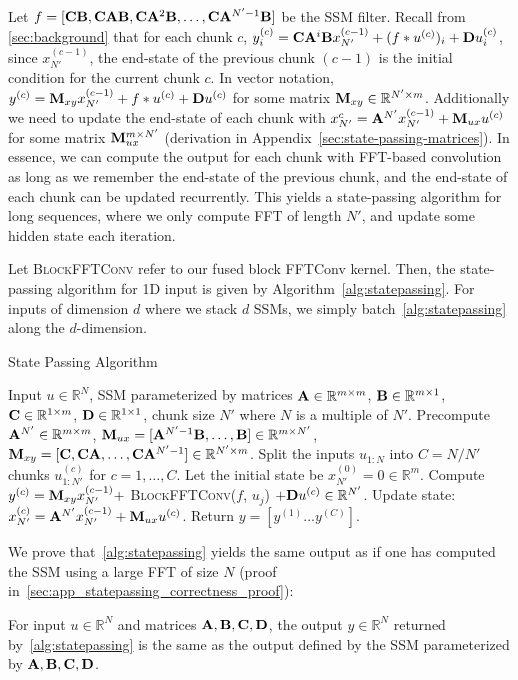 Let $f = [\mathbf{C} \mathbf{B}, \mathbf{C}\mathbf{A}\mathbf{B}, \mathbf{C}\mathbf{A}^2\mathbf{B}, \dots, \mathbf{C}\mathbf{A}^{N'-1}\mathbf{B}]$ be the SSM filter.
Recall from \cref{sec:background} that for each chunk $c$, $y_i^{(c)} = \mathbf{C}\mathbf{A}^i\mathbf{B} x_{N'}^{(c-1)} + (f \ast u^{(c)})_i + \mathbf{D} u_i^{(c)}$, since $x_{N'}^{(c-1)}$, the end-state of the previous chunk $(c-1)$ is the initial condition for the current chunk $c$.
In vector notation, $y^{(c)} = \mathbf{M}_{xy} x_{N'}^{(c-1)} + f \ast u^{(c)} + \mathbf{D} u^{(c)}$ for some matrix $\mathbf{M}_{xy} \in \mathbb{R}^{N' \times m}$.
Additionally we need to update the end-state of each chunk with $x_{N'}^{c} = \mathbf{A}^{N'} x_{N'}^{(c-1)} + \mathbf{M}_{ux} u^{(c)}$ for some matrix $\mathbf{M}_{ux}^{m \times N'}$ (derivation in Appendix~\ref{sec:state-passing-matrices}).
In essence, we can compute the output for each chunk with FFT-based convolution as long as we remember the end-state of the previous chunk, and the end-state of each chunk can be updated recurrently.
This yields a state-passing algorithm for long sequences, where we only compute FFT of length $N'$, and update some hidden state each iteration.

Let \textsc{BlockFFTConv} refer to our fused block FFTConv kernel.
Then, the state-passing algorithm for 1D input is given by Algorithm~\ref{alg:statepassing}.
For inputs of dimension $d$ where we stack $d$ SSMs, we simply batch~\cref{alg:statepassing} along the $d$-dimension.
\begin{algorithm}[h]
  \caption{\label{alg:statepassing} State Passing Algorithm}
  \small
  \begin{algorithmic}[1]
    \REQUIRE Input $u \in \mathbb{R}^{N}$, SSM parameterized by matrices $\mathbf{A} \in \mathbb{R}^{m \times m}$, $\mathbf{B} \in \mathbb{R}^{m \times 1}$, $\mathbf{C} \in \mathbb{R}^{1 \times m}$, $\mathbf{D} \in \mathbb{R}^{1 \times 1}$, chunk size $N'$ where $N$ is a multiple of $N'$.
    \STATE Precompute $\mathbf{A}^{N'} \in \mathbb{R}^{m \times m}$, $\mathbf{M}_{ux} = [\mathbf{A}^{N'-1}\mathbf{B}, \dots, \mathbf{B}] \in \mathbb{R}^{m \times N'}$, $\mathbf{M}_{xy} = [\mathbf{C}, \mathbf{C}\mathbf{A}, \dots, \mathbf{C}\mathbf{A}^{N'-1}] \in \mathbb{R}^{N' \times m}$.
    \STATE Split the inputs $u_{1:N}$ into $C = N/N'$ chunks $u_{1:N'}^{(c)}$ for $c=1, \dots, C$.
    \STATE Let the initial state be $x_{N'}^{(0)} = 0 \in \mathbb{R}^m$.
      \STATE Compute $y^{(c)} = \mathbf{M}_{xy} x_{N'}^{(c-1)} + $ \textsc{BlockFFTConv}($f$, $u_j$) $+ \mathbf{D} u^{(c)} \in \mathbb{R}^{N'}$.
      \STATE Update state: $x_{N'}^{(c)} = \mathbf{A}^{N'} x_{N'}^{(c-1)} + \mathbf{M}_{ux} u^{(c)}$.
    \ENDFOR
    \STATE Return $y = [y^{(1)} \dots y^{(C)}]$.
  \end{algorithmic}
\end{algorithm}

We prove that~\cref{alg:statepassing} yields the same output as if one has computed the SSM using a large FFT of size $N$ (proof in~\cref{sec:app_statepassing_correctness_proof}):
\begin{proposition}\label{thm:statepassing_correctness}
  For input $u \in \mathbb{R}^N$ and matrices $\mathbf{A}, \mathbf{B}, \mathbf{C}, \mathbf{D}$, the output $y \in \mathbb{R}^N$ returned by~\cref{alg:statepassing} is the same as the output defined by the SSM parameterized by $\mathbf{A}, \mathbf{B}, \mathbf{C}, \mathbf{D}$.
\end{proposition}

